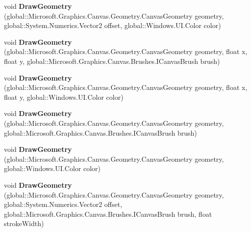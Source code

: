 \begin{DoxyCompactItemize}
void {\bfseries Draw\+Geometry} (global\+::\+Microsoft.\+Graphics.\+Canvas.\+Geometry.\+Canvas\+Geometry geometry, global\+::\+System.\+Numerics.\+Vector2 offset, global\+::\+Windows.\+U\+I.\+Color color)
\item 
\mbox{\label{interface_microsoft_1_1_graphics_1_1_canvas_1_1_i_canvas_drawing_session_a78e71292f3d52ea65e86119c480af3b1}} 
void {\bfseries Draw\+Geometry} (global\+::\+Microsoft.\+Graphics.\+Canvas.\+Geometry.\+Canvas\+Geometry geometry, float x, float y, global\+::\+Microsoft.\+Graphics.\+Canvas.\+Brushes.\+I\+Canvas\+Brush brush)
\item 
\mbox{\label{interface_microsoft_1_1_graphics_1_1_canvas_1_1_i_canvas_drawing_session_a190e369f48e7cc85937b9479a6f482e2}} 
void {\bfseries Draw\+Geometry} (global\+::\+Microsoft.\+Graphics.\+Canvas.\+Geometry.\+Canvas\+Geometry geometry, float x, float y, global\+::\+Windows.\+U\+I.\+Color color)
\item 
\mbox{\label{interface_microsoft_1_1_graphics_1_1_canvas_1_1_i_canvas_drawing_session_ac78574a29e5abb844e4ce42a12bc3c4f}} 
void {\bfseries Draw\+Geometry} (global\+::\+Microsoft.\+Graphics.\+Canvas.\+Geometry.\+Canvas\+Geometry geometry, global\+::\+Microsoft.\+Graphics.\+Canvas.\+Brushes.\+I\+Canvas\+Brush brush)
\item 
\mbox{\label{interface_microsoft_1_1_graphics_1_1_canvas_1_1_i_canvas_drawing_session_ac5b9f0631a824d82558c4cd88f42bf6a}} 
void {\bfseries Draw\+Geometry} (global\+::\+Microsoft.\+Graphics.\+Canvas.\+Geometry.\+Canvas\+Geometry geometry, global\+::\+Windows.\+U\+I.\+Color color)
\item 
\mbox{\label{interface_microsoft_1_1_graphics_1_1_canvas_1_1_i_canvas_drawing_session_a9eb69f06c5b4a463ef75f0e98c94634e}} 
void {\bfseries Draw\+Geometry} (global\+::\+Microsoft.\+Graphics.\+Canvas.\+Geometry.\+Canvas\+Geometry geometry, global\+::\+System.\+Numerics.\+Vector2 offset, global\+::\+Microsoft.\+Graphics.\+Canvas.\+Brushes.\+I\+Canvas\+Brush brush, float stroke\+Width)

\end{DoxyCompactItemize}
